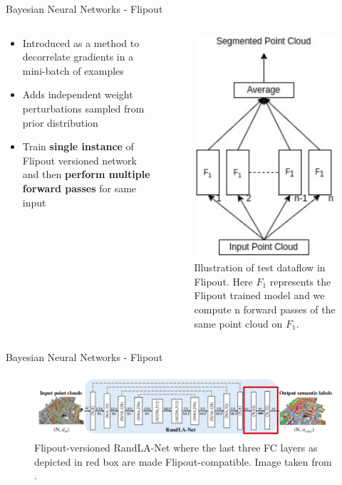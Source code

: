\documentclass[aspectratio=169]{beamer}
\begin{document}
\begin{frame}{Bayesian Neural Networks - Flipout}
    \begin{columns}
        \begin{column}{0.5\textwidth}
            \begin{itemize}
                \item Introduced as a method to decorrelate gradients in a mini-batch of examples
                \item Adds independent weight perturbations sampled from prior distribution
                \item Train \textbf{single instance} of Flipout versioned network and then \textbf{perform multiple forward passes} for same input
            \end{itemize}
        \end{column}
        \begin{column}{0.5\textwidth}
            \begin{figure}
                \centering
                \includegraphics[scale=0.45]{images/flipout.jpg}
                \caption{Illustration of test dataflow in Flipout. Here $F_1$ represents the Flipout trained model and we
                compute n forward passes of the same point cloud on $F_1$.}
                \label{fig:flipout_work}
            \end{figure}
        \end{column}
    \end{columns}
\end{frame}
\begin{frame}{Bayesian Neural Networks - Flipout}
    \begin{figure}
        \centering
        \includegraphics[scale=0.35]{images/fout_randlanet.png}
        \caption{Flipout-versioned RandLA-Net where the last three FC layers as depicted in red box are made
        Flipout-compatible. Image taken from \cite{Hu_2020_CVPR_Randla}.}
    \end{figure}
\end{frame}
\end{document}
